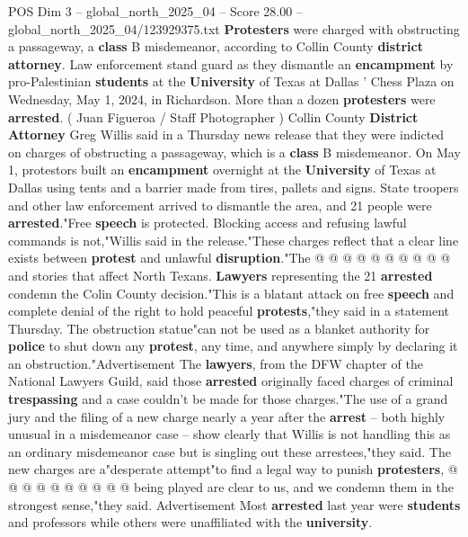 \begin{textsample}{POS Dim 3 – global\_north\_2025\_04 – Score 28.00 – global\_north\_2025\_04/123929375.txt}  \label{ex:f3_pos_048}
\textbf{Protesters} were charged with obstructing a passageway, a \textbf{class} B misdemeanor, according to Collin County \textbf{district} \textbf{attorney}.
Law enforcement stand guard as they dismantle an \textbf{encampment} by pro-Palestinian \textbf{students} at the \textbf{University} of Texas at Dallas ' Chess Plaza on Wednesday, May 1, 2024, in Richardson.
More than a dozen \textbf{protesters} were \textbf{arrested}. ( Juan Figueroa / Staff Photographer ) Collin County \textbf{District} \textbf{Attorney} Greg Willis said in a Thursday news release that they were indicted on charges of obstructing a passageway, which is a \textbf{class} B misdemeanor.
On May 1, protestors built an \textbf{encampment} overnight at the \textbf{University} of Texas at Dallas using tents and a barrier made from tires, pallets and signs.
State troopers and other law enforcement arrived to dismantle the area, and 21 people were \textbf{arrested}."Free \textbf{speech} is protected.
Blocking access and refusing lawful commands is not,"Willis said in the release."These charges reflect that a clear line exists between \textbf{protest} and unlawful \textbf{disruption}."The @ @ @ @ @ @ @ @ @ @ and stories that affect North Texans. \textbf{Lawyers} representing the 21 \textbf{arrested} condemn the Colin County decision."This is a blatant attack on free \textbf{speech} and complete denial of the right to hold peaceful \textbf{protests},"they said in a statement Thursday.
The obstruction statue"can not be used as a blanket authority for \textbf{police} to shut down any \textbf{protest}, any time, and anywhere simply by declaring it an obstruction."Advertisement The \textbf{lawyers}, from the DFW chapter of the National Lawyers Guild, said those \textbf{arrested} originally faced charges of criminal \textbf{trespassing} and a case couldn't be made for those charges."The use of a grand jury and the filing of a new charge nearly a year after the \textbf{arrest} -- both highly unusual in a misdemeanor case -- show clearly that Willis is not handling this as an ordinary misdemeanor case but is singling out these arrestees,"they said.
The new charges are a"desperate attempt"to find a legal way to punish \textbf{protesters}, @ @ @ @ @ @ @ @ @ @ being played are clear to us, and we condemn them in the strongest sense,"they said.
Advertisement Most \textbf{arrested} last year were \textbf{students} and professors while others were unaffiliated with the \textbf{university}.

\end{textsample}
